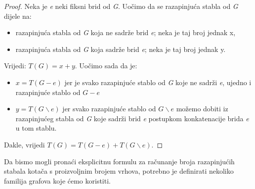 \documentclass[times, utf8, zavrsni]{fer}
\begin{document}
\begin{proof}
Neka je \textit{e} neki fiksni brid od \textit{G}. Uočimo da se razapinjuća stabla od \textit{G} dijele na:
\begin{itemize}
	\item razapinjuća stabla od \textit{G} koja ne sadrže brid \textit{e}; neka je taj broj jednak x,
	\item razapinjuća stabla od \textit{G} koja sadrže brid \textit{e}; neka je taj broj jednak y.
\end{itemize}
Vrijedi: $T(G) = x + y$. Uočimo sada da je:
\begin{itemize}
	\item $x = T(G - e)$ jer je svako razapinjuće stablo od \textit{G} koje ne sadrži \textit{e}, ujedno i razapinjuće stablo od $G - e$
	\item $y = T(G \backslash e)$ jer svako razapinjuće stablo od $G \backslash e$ možemo dobiti iz razapinjućeg stabla od \textit{G} koje sadrži brid \textit{e} postupkom konkatenacije brida \textit{e} u tom stablu.
\end{itemize}
Dakle, vrijedi $T(G) = T(G - e) + T(G \backslash e)$.
\end{proof}

Da bismo mogli pronaći eksplicitnu formulu za računanje broja razapinjućih stabala kotača s proizvoljnim brojem vrhova, potrebno je definirati nekoliko familija grafova koje ćemo koristiti.
\end{document}
